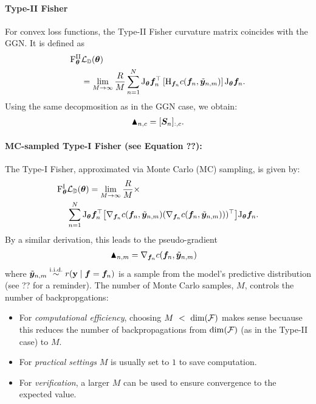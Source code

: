 \paragraph{Type-II Fisher}
For convex loss functions, the Type-II Fisher curvature matrix coincides with the GGN. It is defined as 
\begin{align*}
\mathrm{F}^{\text{II}}_{{\bm{\theta}}} &{\mathcal{L}}_{{\mathbb{D}}}({\bm{\theta}}) \\ &=
  \lim_{M \to \infty}
  \frac{R}{M} \sum_{n=1}^N
  \mathrm{J}_{{\bm{\theta}}} {\bm{f}}_n^{\top}
  \left[
  \mathrm{H}_{{\bm{f}}_n} c({\bm{f}}_n, \tilde{{\bm{y}}}_{n,m})
  \right]
  \mathrm{J}_{{\bm{\theta}}} {\bm{f}}_n.
\end{align*}
Using the same decopmosition as in the GGN case, we obtain:
\begin{align*}
  \blacktriangle_{n,c} = [{\bm{S}}_n]_{:,c}.
\end{align*}

\paragraph{MC-sampled Type-I Fisher (see Equation ??): }
The Type-I Fisher, approximated via Monte Carlo (MC) sampling, is given by:
\begin{align*}
\mathrm{F}^{\text{I}}_{{\bm{\theta}}} &{\mathcal{L}}_{{\mathbb{D}}}({\bm{\theta}})
=
  \lim_{M \to \infty}
  \frac{R}{M} \times \\
&\sum_{n=1}^N
  \mathrm{J}_{{\bm{\theta}}} {\bm{f}}_n^{\top}
  \big[
  \nabla_{{\bm{f}}_n} c({\bm{f}}_n, \tilde{{\bm{y}}}_{n,m})
(\nabla_{{\bm{f}}_n} c({\bm{f}}_n, \tilde{{\bm{y}}}_{n,m})))^{\top}
\big]
\mathrm{J}_{{\bm{\theta}}} {\bm{f}}_n.
\end{align*}
By a similar derivation, this leads to the pseudo-gradient 
\begin{align*}
  \blacktriangle_{n,m}
  &= \nabla_{{\bm{f}}_n}  c({\bm{f}}_n, \tilde{{\bm{y}}}_{n,m})
\end{align*}
where $\tilde{{\bm{y}}}_{n,m} \stackrel{\text{i.i.d.}}{\sim} r({\mathbf{y}} \mid {\bm{f}} = {\bm{f}}_n)$ is a sample from the model's predictive distribution (see ?? for a reminder).
The number of Monte Carlo samples, $M$, controls the number of backpropgations:
\begin{itemize}
 \item For \emph{computational efficiency}, choosing $M~<~\dim({\mathcal{F}})$ makes sense becuause this reduces the number of backpropagations from $\dim({\mathcal{F}})$ (as in the Type-II case) to $M$.
 \item For \emph{practical settings} $M$ is usually set to $1$ to save computation.
 \item For \emph{verification}, a larger $M$ can be used to ensure convergence to the expected value.
\end{itemize}

